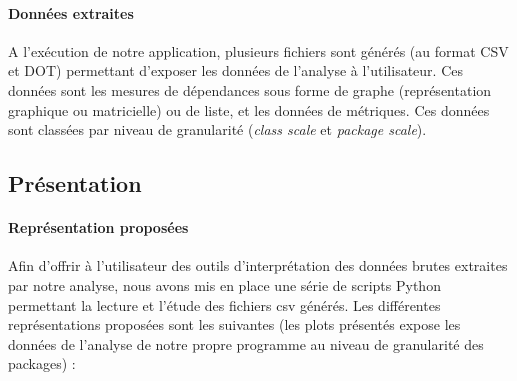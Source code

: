\documentclass{scrartcl}
\begin{document}
    \paragraph{Données extraites}A l'exécution de notre application, plusieurs fichiers sont générés (au format CSV et DOT) permettant d'exposer les données de l'analyse à l'utilisateur. Ces données sont les mesures de dépendances sous forme de graphe (représentation graphique ou matricielle) ou de liste, et les données de métriques. Ces données sont classées par niveau de granularité (\emph{class scale} et \emph{package scale}).

\subsection{Présentation}

    \paragraph{Représentation proposées}Afin d'offrir à l'utilisateur des outils d'interprétation des données brutes extraites par notre analyse, nous avons mis en place une série de scripts Python permettant la lecture et l'étude des fichiers csv générés. Les différentes représentations proposées sont les suivantes (les plots présentés expose les données de l'analyse de notre propre programme au niveau de granularité des packages) :
\end{document}
